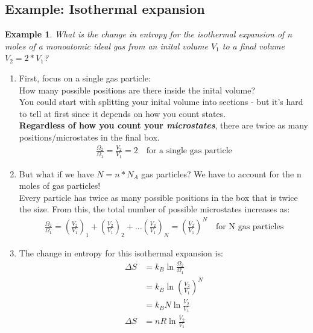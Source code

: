 \documentclass{article}  %
\newtheorem{exmp}{Example}
\begin{document}
\subsection*{Example: Isothermal expansion}
\begin{exmp}
    What is the change in entropy for the isothermal expansion of n moles of a monoatomic ideal gas from an inital volume $V_1$ to a final volume $V_2 = 2*V_1$? 
\end{exmp}
\begin{enumerate}
    \item First, focus on a single gas particle: \\
        How many possible positions are there inside the inital volume? \\
        You could start with splitting your inital volume into sections - but it's hard to tell at first since it depends on how you count states. \\
        \textbf{Regardless of how you count your \emph{microstates}}, there are twice as many positions/microstates in the final box. \\
        \begin{equation*}
            \begin{aligned}
                \frac{\Omega_2}{\Omega_1} = \frac{V_2}{V_1} = 2 \quad \text{for a single gas particle}
            \end{aligned}
        \end{equation*}
    \item But what if we have $N = n * N_A$ gas particles? We have to account for the n moles of gas particles! \\
        Every particle has twice as many possible positions in the box that is twice the size. From this, the total number of possible microstates increases as:
        \begin{equation*}
            \begin{aligned}
                \frac{\Omega_2}{\Omega_1} = \left(\frac{V_2}{V_1}\right)_1 + \left(\frac{V_2}{V_1}\right)_2 + ... \left(\frac{V_2}{V_1}\right)_N  = \left(\frac{V_2}{V_1}\right)^N \quad \text{for N gas particles}
            \end{aligned}
        \end{equation*}
    \item The change in entropy for this isothermal expansion is:
        \begin{equation*}
            \begin{aligned}
                \Delta S &= k_B \ln \frac{\Omega_2}{\Omega_1} \\
                    &= k_B \ln \left(\frac{V_2}{V_1}\right)^N \\
                    &= k_B N \ln \frac{V_2}{V_1} \\
                 \Delta S &= nR\ln\frac{V_2}{V_1}   
            \end{aligned}
        \end{equation*}
\end{enumerate}
\end{document}
